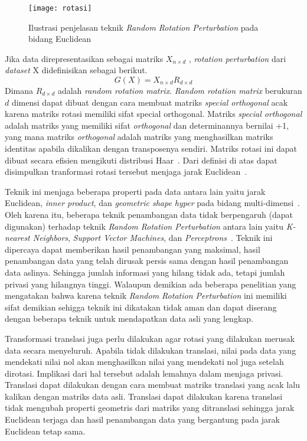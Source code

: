 \begin{figure}
	\centering
	\texttt{[image: rotasi]}
	\caption{Ilustrasi penjelasan teknik \textit{Random Rotation Perturbation} pada bidang Euclidean}
	\label{fig:rotasi}
\end{figure}

Jika data direpresentasikan sebagai matriks \(X_{n \times d}\) , \textit{rotation perturbation} dari \textit{dataset} X didefinisikan sebagai berikut.
\begin{equation}
	G(X) = X_{n \times d} R_{d \times d}
\end{equation}
Dimana \(R_{d \times d}\) adalah \textit{random rotation matrix}. \textit{Random rotation matrix} berukuran \(d\) dimensi dapat dibuat dengan cara membuat matriks \textit{special orthogonal} acak karena matriks rotasi memiliki sifat {special orthogonal}. Matriks \textit{special orthogonal} adalah matriks yang memiliki sifat \textit{orthogonal} dan determinannya bernilai +1, yang mana matriks \textit{orthogonal} adalah matriks yang menghasilkan matriks identitas apabila dikalikan dengan transposenya sendiri. Matriks rotasi ini dapat dibuat secara efisien mengikuti distribusi Haar~\cite{stewart:80:orthogonal}. Dari definisi di atas dapat disimpulkan tranformasi rotasi tersebut menjaga jarak Euclidean~\cite{rotation:05:chenliu}.

Teknik ini menjaga beberapa properti pada data antara lain yaitu jarak Euclidean, \textit{inner product}, dan \textit{geometric shape hyper} pada bidang multi-dimensi~\cite{rezaseifi:11:ppdm}. Oleh karena itu, beberapa teknik penambangan data tidak berpengaruh (dapat digunakan) terhadap teknik \textit{Random Rotation Perturbation} antara lain yaitu \textit{K-nearest Neighbors}, \textit{Support Vector Machines}, dan \textit{Perceptrons}~\cite{rotation:05:chenliu}. Teknik ini dipercaya dapat memberikan hasil penambangan yang maksimal, hasil penambangan data yang telah dirusak persis sama dengan hasil penambangan data aslinya. Sehingga jumlah informasi yang hilang tidak ada, tetapi jumlah privasi yang hilangnya tinggi. Walaupun demikian ada beberapa penelitian yang mengatakan bahwa karena teknik \textit{Random Rotation Perturbation} ini memiliki sifat demikian sehigga teknik ini dikatakan tidak aman dan dapat diserang dengan beberapa teknik untuk mendapatkan data asli yang lengkap.

Transformasi translasi juga perlu dilakukan agar rotasi yang dilakukan merusak data secara menyeluruh. Apabila tidak dilakukan translasi, nilai pada data yang mendekati nilai nol akan menghasilkan nilai yang mendekati nol juga setelah dirotasi. Implikasi dari hal tersebut adalah lemahnya dalam menjaga privasi. Translasi dapat dilakukan dengan cara membuat matriks translasi yang acak lalu kalikan dengan matriks data asli. Translasi dapat dilakukan karena translasi tidak mengubah properti geometris dari matriks yang ditranslasi sehingga jarak Euclidean terjaga dan hasil penambangan data yang bergantung pada jarak Euclidean tetap sama.


